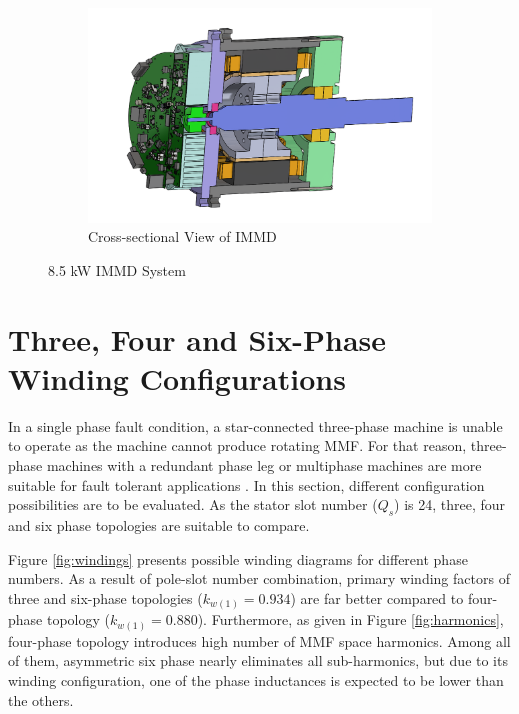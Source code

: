 \documentclass[a4paper,11pt]{article}
\begin{document}
\begin{figure}[ht!]
\begin{subfigure}[b]{0.33\textwidth}
    \label{fig:s6phmmf}    
\end{subfigure}
\begin{subfigure}[b]{0.33\textwidth}
    \centering
    \includegraphics[width=\linewidth]{immd_csview.PNG}
    \caption{Cross-sectional View of IMMD}
    \label{fig:as6phmmf}    
\end{subfigure}
 \caption{8.5 kW IMMD System}
 \label{fig:8kw}
\end{figure}


\section{\normalsize\textbf{Three, Four and Six-Phase Winding Configurations}}
In a single phase fault condition, a star-connected three-phase machine is unable to operate as the machine cannot produce rotating MMF. For that reason, three-phase machines with a redundant phase leg or multiphase machines are more suitable for fault tolerant applications \cite{phaseleg}.
In this section, different configuration possibilities are to be evaluated. As the stator slot number ($Q_s$) is 24, three, four and six phase topologies are suitable to compare.\par
Figure \ref{fig:windings} presents possible winding diagrams for different phase numbers. As a result of pole-slot number combination, primary winding factors of three and six-phase topologies ($k_{w(1)} = 0.934$) are far better compared to four-phase topology ($k_{w(1)} = 0.880$). Furthermore, as given in Figure \ref{fig:harmonics}, four-phase topology introduces high number of MMF space harmonics. Among all of them, asymmetric six phase nearly eliminates all sub-harmonics, but due to its winding configuration, one of the phase inductances is expected to be lower than the others.
\end{document}
